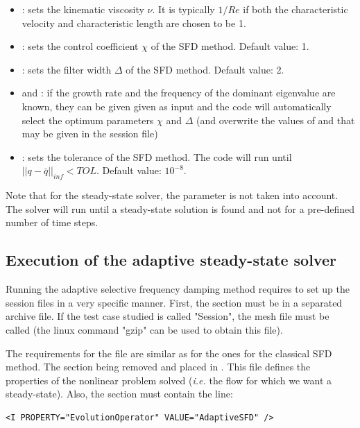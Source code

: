 \begin{itemize}
\item {}: sets the kinematic viscosity $\nu$. It is typically $1/Re$ if both the characteristic velocity and characteristic length are chosen to be 1. 
\item {}: sets the control coefficient $\chi$ of the SFD method. Default value: 1.
\item {}: sets the filter width $\Delta$ of the SFD method. Default value: 2.
\item {} and : if the growth rate and the frequency of the dominant eigenvalue are known, they can be given given as input and the code will automatically select the optimum parameters $\chi$ and $\Delta$ (and overwrite the values of  and  that may be given in the session file)
\item {}: sets the tolerance of the SFD method. The code will run until $||q-\bar{q}||_{inf}<TOL$.  Default value: $10^{-8}$.
\end{itemize}

Note that for the steady-state solver, the parameter  is not taken into account. The solver will run until a steady-state solution is found and not for a pre-defined number of time steps.

\subsection{Execution of the adaptive steady-state solver}

Running the adaptive selective frequency damping method requires to set up the session files in a very specific manner. First, the  section must be in a separated archive file. If the test case studied is called "Session", the mesh file must be called  (the linux command "gzip" can be used to obtain this file).

The requirements for the file  are similar as for the ones for the classical SFD method. The  section being removed and placed in . This file defines the properties of the nonlinear problem solved (\textit{i.e.} the flow for which we want a steady-state). Also, the  section must contain the line:
\begin{lstlisting}[style=XMLStyle]
<I PROPERTY="EvolutionOperator" VALUE="AdaptiveSFD" />
\end{lstlisting}

